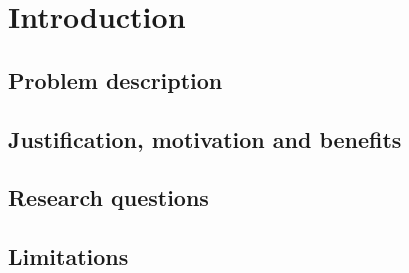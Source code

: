 \chapter{Introduction}

\section{Problem description}

\section{Justification, motivation and benefits}

\section{Research questions}

\section{Limitations}
